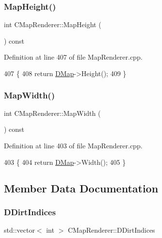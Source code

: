 \subsubsection{\texorpdfstring{Map\+Height()}{MapHeight()}}
{\footnotesize\ttfamily int C\+Map\+Renderer\+::\+Map\+Height (\begin{DoxyParamCaption}{ }\end{DoxyParamCaption}) const}



Definition at line 407 of file Map\+Renderer.\+cpp.


\begin{DoxyCode}
407                                  \{
408     \textcolor{keywordflow}{return} \hyperlink{classCMapRenderer_ab9a199c61aa1c87a3248af3085d8ba52}{DMap}->Height();
409 \}
\end{DoxyCode}
\hypertarget{classCMapRenderer_a4b63ead9be943cbe40b936fa224dc826}{}\label{classCMapRenderer_a4b63ead9be943cbe40b936fa224dc826} 
\subsubsection{\texorpdfstring{Map\+Width()}{MapWidth()}}
{\footnotesize\ttfamily int C\+Map\+Renderer\+::\+Map\+Width (\begin{DoxyParamCaption}{ }\end{DoxyParamCaption}) const}



Definition at line 403 of file Map\+Renderer.\+cpp.


\begin{DoxyCode}
403                                 \{
404     \textcolor{keywordflow}{return} \hyperlink{classCMapRenderer_ab9a199c61aa1c87a3248af3085d8ba52}{DMap}->Width();
405 \}
\end{DoxyCode}


\subsection{Member Data Documentation}
\hypertarget{classCMapRenderer_a5916c26aa5bedf8367a8f3f7efb457bf}{}\label{classCMapRenderer_a5916c26aa5bedf8367a8f3f7efb457bf} 
\subsubsection{\texorpdfstring{D\+Dirt\+Indices}{DDirtIndices}}
{\footnotesize\ttfamily std\+::vector$<$ int $>$ C\+Map\+Renderer\+::\+D\+Dirt\+Indices\hspace{0.3cm}{\ttfamily [protected]}}




